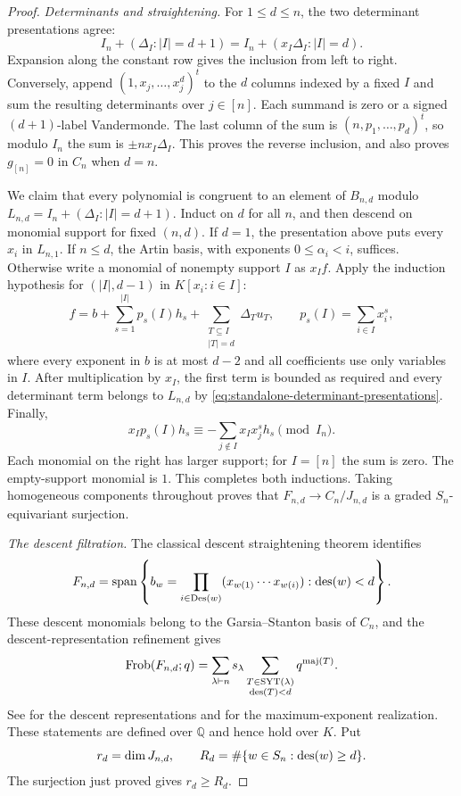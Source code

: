 \begin{proof}
\emph{Determinants and straightening.}
For $1\le d\le n$, the two determinant presentations agree:
\begin{equation}\label{eq:standalone-determinant-presentations}
 I_n+(\Delta_I:|I|=d+1)
       =I_n+(x_I\Delta_I:|I|=d).
\end{equation}
Expansion along the constant row gives the inclusion from left
to right.  Conversely, append $(1,x_j,\ldots,x_j^d)^t$ to the
$d$ columns indexed by a fixed $I$ and sum the resulting
determinants over $j\in[n]$.  Each summand is zero or a signed
$(d+1)$-label Vandermonde.  The last column of the sum is
$(n,p_1,\ldots,p_d)^t$, so modulo $I_n$ the sum is
$\pm n x_I\Delta_I$.  This proves the reverse inclusion, and
also proves $g_{[n]}=0$ in $C_n$ when $d=n$.

We claim that every polynomial is congruent to an element of
$B_{n,d}$ modulo
$L_{n,d}=I_n+(\Delta_I:|I|=d+1)$.
Induct on $d$ for all $n$, and then descend on monomial support
for fixed $(n,d)$.  If $d=1$, the presentation above puts every
$x_i$ in $L_{n,1}$.  If $n\le d$, the Artin basis, with
exponents $0\le\alpha_i<i$, suffices.
Otherwise write a monomial of nonempty support $I$ as $x_I f$.
Apply the induction hypothesis for $(|I|,d-1)$ in $K[x_i:i\in I]$:
\[
 f=b+\sum_{s=1}^{|I|}p_s(I)h_s
       +\sum_{\substack{T\subseteq I\\|T|=d}}\Delta_T u_T,
 \qquad p_s(I)=\sum_{i\in I}x_i^s,
\]
where every exponent in $b$ is at most $d-2$ and all coefficients
use only variables in $I$.  After multiplication by $x_I$, the
first term is bounded as required and every determinant term
belongs to $L_{n,d}$ by
\eqref{eq:standalone-determinant-presentations}.  Finally,
\[
 x_Ip_s(I)h_s\equiv
       -\sum_{j\notin I}x_Ix_j^s h_s\pmod{I_n}.
\]
Each monomial on the right has larger support; for $I=[n]$ the
sum is zero.  The empty-support monomial is $1$.
This completes both inductions.  Taking homogeneous components
throughout proves that $F_{n,d}\to C_n/J_{n,d}$ is a graded
$S_n$-equivariant surjection.

\emph{The descent filtration.}
The classical descent straightening theorem identifies
\[
 F_{n,d}=\operatorname{span}
   \left\{b_w=\prod_{i\in\operatorname{Des}(w)}
                   (x_{w(1)}\cdots x_{w(i)}):\operatorname{des}(w)<d\right\}.
\]
These descent monomials belong to the Garsia--Stanton basis of
$C_n$, and the descent-representation refinement gives
\begin{equation}\label{eq:standalone-descent-filtration}
 \operatorname{Frob}(F_{n,d};q)=\sum_{\lambda\vdash n}s_\lambda
       \sum_{\substack{T\in\operatorname{SYT}(\lambda)\\\operatorname{des}(T)<d}}
                       q^{\operatorname{maj}(T)}.
\end{equation}
See \cite[Theorems~3.12 and~4.1]
{AdinBrentiRoichman2005} for the descent representations and
\cite[Section~4, Theorem~4.3 and the paragraph following it]
{GnedinGorinKerov2013} for the maximum-exponent realization.
These statements are defined
over $\mathbb Q$ and hence hold over $K$.
Put
\[
 r_d=\dim J_{n,d},\qquad
 R_d=\#\{w\in S_n:\operatorname{des}(w)\ge d\}.
\]
The surjection just proved gives $r_d\ge R_d$.


\end{proof}
